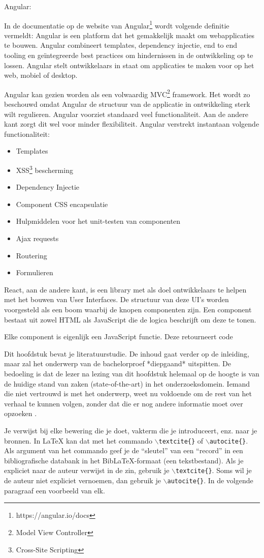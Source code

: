 Angular:

In de documentatie op de website van Angular\footnote{https://angular.io/docs} wordt volgende definitie vermeldt: Angular is een platform dat het gemakkelijk maakt om webapplicaties te bouwen. Angular combineert templates, dependency injectie, end to end tooling en geïntegreerde best practices om hindernissen in de ontwikkeling op te lossen. Angular stelt ontwikkelaars in staat om applicaties te maken voor op het web, mobiel of desktop.

Angular kan gezien worden als een volwaardig MVC\footnote{Model View Controller} framework. Het wordt zo beschouwd omdat Angular de structuur van de applicatie in ontwikkeling sterk wilt regulieren. Angular voorziet standaard veel functionaliteit. Aan de andere kant zorgt dit wel voor minder flexibiliteit. Angular verstrekt instantaan volgende functionaliteit:
\begin{itemize}
	\item Templates
	\item XSS\footnote{Cross-Site Scripting} bescherming
	\item Dependency Injectie
	\item Component CSS encapsulatie
	\item Hulpmiddelen voor het unit-testen van componenten
	\item Ajax requests
	\item Routering
	\item Formulieren
\end{itemize}

React, aan de andere kant, is een library met als doel ontwikkelaars te helpen met het bouwen van User Interfaces. De structuur van deze UI's worden voorgesteld als een boom waarbij de knopen componenten zijn. Een component bestaat uit zowel HTML als JavaScript die de logica beschrijft om deze te tonen. \autocite{Baer2018}

Elke component is eigenlijk een JavaScript functie. Deze retourneert code 




Dit hoofdstuk bevat je literatuurstudie. De inhoud gaat verder op de inleiding, maar zal het onderwerp van de bachelorproef *diepgaand* uitspitten. De bedoeling is dat de lezer na lezing van dit hoofdstuk helemaal op de hoogte is van de huidige stand van zaken (state-of-the-art) in het onderzoeksdomein. Iemand die niet vertrouwd is met het onderwerp, weet nu voldoende om de rest van het verhaal te kunnen volgen, zonder dat die er nog andere informatie moet over opzoeken \autocite{Pollefliet2011}.

Je verwijst bij elke bewering die je doet, vakterm die je introduceert, enz. naar je bronnen. In \LaTeX{} kan dat met het commando \texttt{$\backslash${textcite\{\}}} of \texttt{$\backslash${autocite\{\}}}. Als argument van het commando geef je de ``sleutel'' van een ``record'' in een bibliografische databank in het Bib\LaTeX{}-formaat (een tekstbestand). Als je expliciet naar de auteur verwijst in de zin, gebruik je \texttt{$\backslash${}textcite\{\}}.
Soms wil je de auteur niet expliciet vernoemen, dan gebruik je \texttt{$\backslash${}autocite\{\}}. In de volgende paragraaf een voorbeeld van elk.


\lipsum[7-20]
